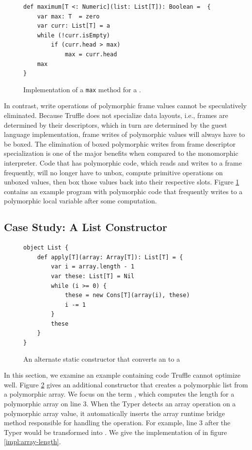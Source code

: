 \begin{figure}[!htb]
\begin{verbatim}
def maximum[T <: Numeric](list: List[T]): Boolean =  {
	var max: T  = zero
	var curr: List[T] = a
	while (!curr.isEmpty) 
		if (curr.head > max)
			max = curr.head 
	max
}
\end{verbatim}
\caption{Implementation of a \texttt{max} method for a .}
\label{impl:list-max}
\end{figure}

\newpage 

In contrast, write operations of polymorphic frame values cannot be speculatively eliminated. 
Because Truffle does not specialize data layouts, i.e., frames are determined by their descriptors, which in turn are determined by the guest language implementation, frame writes of polymorphic values will always have to be boxed.
The elimination of boxed polymorphic writes from frame descriptor specialization is one of the major benefits when compared to the monomorphic interpreter.
Code that has polymorphic code, which reads and writes to a frame frequently, will no longer have to unbox, compute primitive operations on unboxed values, then box those values back into their respective slots.
Figure \ref{impl:list-max} contains an example program with polymorphic code that frequently writes to a polymorphic local variable after some computation.

\subsection{Case Study: A List Constructor}

\begin{figure}[!htb]
\begin{verbatim}
object List {
	def apply[T](array: Array[T]): List[T] = {
		var i = array.length - 1
		var these: List[T] = Nil
		while (i >= 0) {
			these = new Cons[T](array(i), these)
			i -= 1
		}
		these
	}	
}
\end{verbatim}
\caption{An alternate static constructor that converts an  to a }
\label{impl:list-alt-constructor}
\end{figure}

In this section, we examine an example containing code Truffle cannot optimize well.
Figure \ref{impl:list-alt-constructor} gives an additional constructor that creates a polymorphic list from a polymorphic array.
We focus on the term , which computes the length for a polymorphic array on line $3$.
When the Typer detects an array operation on a polymorphic array value, it automatically inserts the array runtime bridge method responsible for handling the operation.
For example, line $3$ after the Typer would be transformed into .
We give the implementation of  in figure \ref{impl:array-length}.

